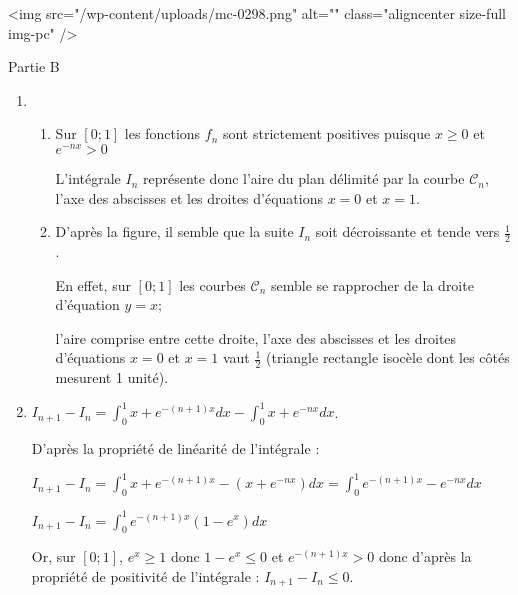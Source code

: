 \begin{corrige}
\begin{enumerate}
\begin{center}
\begin{extern}
{
      }
   \end{extern}
\end{center}
<img src="/wp-content/uploads/mc-0298.png" alt="" class="aligncenter size-full  img-pc" />
     \end{enumerate}
     \begin{h3}Partie B\end{h3}
     \begin{enumerate}
          \item
          \begin{enumerate}[label=\alph*.]
               \item
               Sur $\left[0;1\right]$ les fonctions $f_{n}$ sont strictement positives puisque $x \geqslant 0$ et $e^{-nx} > 0$
               \par
               L'intégrale $I_{n}$ représente donc l'aire du plan délimité par la courbe $\mathscr C_{n}$, l'axe des abscisses et les droites d'équations $x=0$ et $x=1$.
               \item
               D'après la figure, il semble que la suite $I_{n}$ soit décroissante et tende vers $\frac{1}{2}$.
               \par
               En effet, sur $\left[0;1\right]$ les courbes $\mathscr C_{n}$ semble se rapprocher de la droite d'équation $y=x$;
               \par
               l'aire comprise entre cette droite, l'axe des abscisses et les droites d'équations $x=0$ et $x=1$ vaut $\frac{1}{2}$ (triangle rectangle isocèle dont les côtés mesurent 1 unité).
          \end{enumerate}
          \item
          $I_{n+1}-I_{n}=\int_{0}^{1}x+e^{-\left(n+1\right)x}dx-\int_{0}^{1}x+e^{-nx}dx$.
          \par
          D'après la propriété de linéarité de l'intégrale :
          \par
          $I_{n+1}-I_{n}=\int_{0}^{1}x+e^{-\left(n+1\right)x}-\left(x+e^{-nx}\right)dx=\int_{0}^{1}e^{-\left(n+1\right)x}-e^{-nx}dx $
          \par
          $I_{n+1}-I_{n}= \int_{0}^{1}e^{-\left(n+1\right)x} \left(1-e^{x}\right)dx  $
          \par
          Or, sur $\left[0;1\right]$,  $e^{x} \geqslant  1$ donc $1-e^{x}\leqslant 0$ et $e^{-\left(n+1\right)x} > 0$ donc d'après la propriété de positivité de l'intégrale : $I_{n+1}-I_{n} \leqslant  0$.

\end{enumerate}
\end{corrige}
